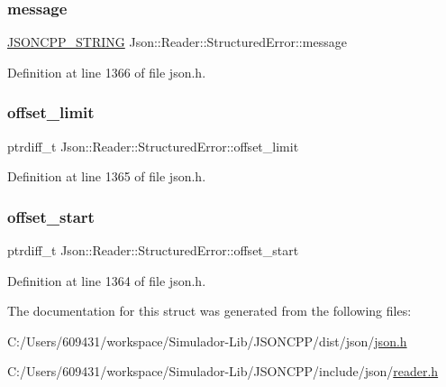 \subsubsection{\texorpdfstring{message}{message}}
{\footnotesize\ttfamily \hyperlink{config_8h_a1e723f95759de062585bc4a8fd3fa4be}{J\+S\+O\+N\+C\+P\+P\+\_\+\+S\+T\+R\+I\+NG} Json\+::\+Reader\+::\+Structured\+Error\+::message}



Definition at line 1366 of file json.\+h.

\hypertarget{struct_json_1_1_reader_1_1_structured_error_ad76ac01aeb0ada7e882c2df5daa54c6e}{}\label{struct_json_1_1_reader_1_1_structured_error_ad76ac01aeb0ada7e882c2df5daa54c6e} 
\subsubsection{\texorpdfstring{offset\+\_\+limit}{offset\_limit}}
{\footnotesize\ttfamily ptrdiff\+\_\+t Json\+::\+Reader\+::\+Structured\+Error\+::offset\+\_\+limit}



Definition at line 1365 of file json.\+h.

\hypertarget{struct_json_1_1_reader_1_1_structured_error_ac98af0da2d704be4b64a9572a682423b}{}\label{struct_json_1_1_reader_1_1_structured_error_ac98af0da2d704be4b64a9572a682423b} 
\subsubsection{\texorpdfstring{offset\+\_\+start}{offset\_start}}
{\footnotesize\ttfamily ptrdiff\+\_\+t Json\+::\+Reader\+::\+Structured\+Error\+::offset\+\_\+start}



Definition at line 1364 of file json.\+h.



The documentation for this struct was generated from the following files\+:\begin{DoxyCompactItemize}
\item 
C\+:/\+Users/609431/workspace/\+Simulador-\/\+Lib/\+J\+S\+O\+N\+C\+P\+P/dist/json/\hyperlink{dist_2json_2json_8h}{json.\+h}\item 
C\+:/\+Users/609431/workspace/\+Simulador-\/\+Lib/\+J\+S\+O\+N\+C\+P\+P/include/json/\hyperlink{reader_8h}{reader.\+h}\end{DoxyCompactItemize}
